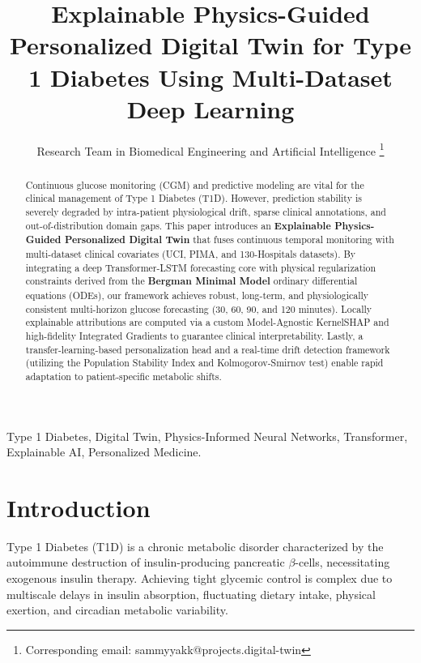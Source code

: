 \documentclass[10pt,journal,compsoc,twocolumn]{IEEEtran}
\begin{document}
\title{Explainable Physics-Guided Personalized Digital Twin for Type 1 Diabetes Using Multi-Dataset Deep Learning}

\author{Research Team in Biomedical Engineering and Artificial Intelligence
\thanks{Corresponding email: sammyyakk@projects.digital-twin}}

\maketitle

\begin{abstract}
Continuous glucose monitoring (CGM) and predictive modeling are vital for the clinical management of Type 1 Diabetes (T1D). However, prediction stability is severely degraded by intra-patient physiological drift, sparse clinical annotations, and out-of-distribution domain gaps. This paper introduces an \textbf{Explainable Physics-Guided Personalized Digital Twin} that fuses continuous temporal monitoring with multi-dataset clinical covariates (UCI, PIMA, and 130-Hospitals datasets). By integrating a deep Transformer-LSTM forecasting core with physical regularization constraints derived from the \textbf{Bergman Minimal Model} ordinary differential equations (ODEs), our framework achieves robust, long-term, and physiologically consistent multi-horizon glucose forecasting (30, 60, 90, and 120 minutes). Locally explainable attributions are computed via a custom Model-Agnostic KernelSHAP and high-fidelity Integrated Gradients to guarantee clinical interpretability. Lastly, a transfer-learning-based personalization head and a real-time drift detection framework (utilizing the Population Stability Index and Kolmogorov-Smirnov test) enable rapid adaptation to patient-specific metabolic shifts.
\end{abstract}

\begin{IEEEkeywords}
Type 1 Diabetes, Digital Twin, Physics-Informed Neural Networks, Transformer, Explainable AI, Personalized Medicine.
\end{IEEEkeywords}

\section{Introduction}
Type 1 Diabetes (T1D) is a chronic metabolic disorder characterized by the autoimmune destruction of insulin-producing pancreatic $\beta$-cells, necessitating exogenous insulin therapy. Achieving tight glycemic control is complex due to multiscale delays in insulin absorption, fluctuating dietary intake, physical exertion, and circadian metabolic variability. 
\end{document}
